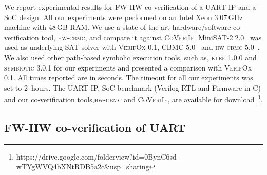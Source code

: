 \documentclass[sigconf]{acmart}
\newcommand{\tool}[1]{\textsc{#1}\xspace}
\newcommand{\hwcbmcv}{\tool{hw-cbmc}}
\newcommand{\hwcbmcver}{\tool{hw-cbmc 5.0}}
\newcommand{\verifoxver}{\tool{VerifOx 0.1}}
\newcommand{\verifox}{\tool{CoVeriIf}}
\newcommand{\kleever}{\tool{klee 1.0.0}}
\newcommand{\symbioticver}{\tool{symbiotic 3.0.1}}
\newcommand{\Omit}[1]{}
\begin{document}
We report experimental results for FW-HW co-verification of a UART IP and a
SoC design.  All our experiments were performed on an Intel Xeon 3.07\,GHz
machine with 48\,GB RAM.  We use a state-of-the-art hardware/software
co-verification tool, \hwcbmcv, and compare it against \verifox. 
MiniSAT-2.2.0~\cite{DBLP:conf/sat/EenB05} was used as underlying SAT solver
with \verifoxver, CBMC-5.0~\cite{DBLP:conf/tacas/ClarkeKL04} and
\hwcbmcver~\cite{CK03}.  We also used other path-based symbolic execution
tools, such as, \kleever and \symbioticver for our experiments and presented
a comparison with \verifoxver.  All times reported are in seconds.  The
timeout for all our experiments was set to 2~hours.  The UART IP, SoC
benchmark (Verilog RTL and Firmware in C) and our co-verification
tools,\hwcbmcv and \verifox, are available for
download~\footnote{https://drive.google.com/folderview?id=0BynC6sd-wTYgWVQ4bXNtRDB5a2c\&usp=sharing}.

\Omit{
\item {\em {\verifox} -- A tool for HW/SW co-verification:} We address the
co-verification problem at post-RTL phase and present a tool, \verifox, for
bounded HW/SW co-verification of IP level and SoC level design.  \verifox
supports IEEE 1364-2005 System Verilog standards and the C89, C99 standards. 
\verifox also supports SAT and SMT backends for constraint solving.  
}
\Omit{
Even though \verifox supports SMT solvers such as
Z3~\cite{z32008} as backend solvers, the current implementation communicates
with these solvers using files rather than APIs.  Since a new solver
instance is generated for every query, incremental encoding cannot be used. 
Due to this, the runtimes of \verifox with SMT solvers on benchmarks are
significantly higher.  As the current implementation does not support
incremental encoding with SMT solvers, the runtimes would not provide a fair
comparison of \verifox with SMT versus \verifox with SAT solvers. 
Therefore, we are omitting the results obtained using SMT solvers.  

All the benchmarks in
Verilog (excluding commercial ARM IP), software-netlist models in C,
firmware models, our tool \textsc{Verifox} and scripts for running \hwcbmcv,
\cbmc, \textsc{klee} and \textsc{Symbiotic} are available
here~\footnote{https://drive.google.com/file/d/0BynC6sd-wTYgSEU5eEswbnRqWUE/view?usp=sharing}
}

\subsection{FW-HW co-verification of UART}
\end{document}
